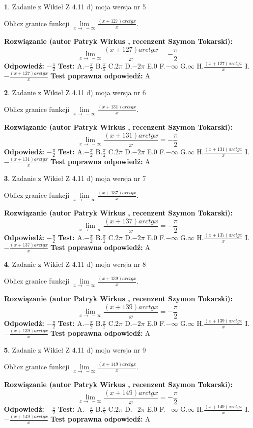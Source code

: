 \documentclass[12pt, a4paper]{article}
\theoremstyle{definition} %
\newtheorem{zad}{}
\newcommand{\zadStart}[1]{\begin{zad}#1\newline}
\newcommand{\zadStop}{\end{zad}}
\newcommand{\rozwStart}[2]{\noindent \textbf{Rozwiązanie (autor #1 , recenzent #2): }\newline}
\newcommand{\rozwStop}{\newline}
\newcommand{\odpStart}{\noindent \textbf{Odpowiedź:}\newline}
\newcommand{\odpStop}{\newline}
\newcommand{\testStart}{\noindent \textbf{Test:}\newline}
\newcommand{\testStop}{\newline}
\newcommand{\kluczStart}{\noindent \textbf{Test poprawna odpowiedź:}\newline}
\newcommand{\kluczStop}{\newline}
\begin{document}
\zadStart{Zadanie z Wikieł Z 4.11 d) moja wersja nr 5}

Oblicz granice funkcji $\lim\limits_{x\to\ -\infty}\frac{(x+127)arctgx}{x}$.
\zadStop
\rozwStart{Patryk Wirkus}{Szymon Tokarski}
$$\lim\limits_{x\to\ -\infty}\frac{(x+127)arctgx}{x} = -\frac{\pi}{2}$$
\rozwStop
\odpStart
$-\frac{\pi}{2}$
\odpStop
\testStart
A.$-\frac{\pi}{2}$ B.$\frac{\pi}{2}$ C.$2\pi$ D.$-2\pi$ E.$0$ F.$-\infty$ G.$\infty$ H.$\frac{(x+127)arctgx}{x}$ I.$-\frac{(x+127)arctgx}{x}$
\testStop
\kluczStart
A
\kluczStop



\zadStart{Zadanie z Wikieł Z 4.11 d) moja wersja nr 6}

Oblicz granice funkcji $\lim\limits_{x\to\ -\infty}\frac{(x+131)arctgx}{x}$.
\zadStop
\rozwStart{Patryk Wirkus}{Szymon Tokarski}
$$\lim\limits_{x\to\ -\infty}\frac{(x+131)arctgx}{x} = -\frac{\pi}{2}$$
\rozwStop
\odpStart
$-\frac{\pi}{2}$
\odpStop
\testStart
A.$-\frac{\pi}{2}$ B.$\frac{\pi}{2}$ C.$2\pi$ D.$-2\pi$ E.$0$ F.$-\infty$ G.$\infty$ H.$\frac{(x+131)arctgx}{x}$ I.$-\frac{(x+131)arctgx}{x}$
\testStop
\kluczStart
A
\kluczStop



\zadStart{Zadanie z Wikieł Z 4.11 d) moja wersja nr 7}

Oblicz granice funkcji $\lim\limits_{x\to\ -\infty}\frac{(x+137)arctgx}{x}$.
\zadStop
\rozwStart{Patryk Wirkus}{Szymon Tokarski}
$$\lim\limits_{x\to\ -\infty}\frac{(x+137)arctgx}{x} = -\frac{\pi}{2}$$
\rozwStop
\odpStart
$-\frac{\pi}{2}$
\odpStop
\testStart
A.$-\frac{\pi}{2}$ B.$\frac{\pi}{2}$ C.$2\pi$ D.$-2\pi$ E.$0$ F.$-\infty$ G.$\infty$ H.$\frac{(x+137)arctgx}{x}$ I.$-\frac{(x+137)arctgx}{x}$
\testStop
\kluczStart
A
\kluczStop



\zadStart{Zadanie z Wikieł Z 4.11 d) moja wersja nr 8}

Oblicz granice funkcji $\lim\limits_{x\to\ -\infty}\frac{(x+139)arctgx}{x}$.
\zadStop
\rozwStart{Patryk Wirkus}{Szymon Tokarski}
$$\lim\limits_{x\to\ -\infty}\frac{(x+139)arctgx}{x} = -\frac{\pi}{2}$$
\rozwStop
\odpStart
$-\frac{\pi}{2}$
\odpStop
\testStart
A.$-\frac{\pi}{2}$ B.$\frac{\pi}{2}$ C.$2\pi$ D.$-2\pi$ E.$0$ F.$-\infty$ G.$\infty$ H.$\frac{(x+139)arctgx}{x}$ I.$-\frac{(x+139)arctgx}{x}$
\testStop
\kluczStart
A
\kluczStop



\zadStart{Zadanie z Wikieł Z 4.11 d) moja wersja nr 9}

Oblicz granice funkcji $\lim\limits_{x\to\ -\infty}\frac{(x+149)arctgx}{x}$.
\zadStop
\rozwStart{Patryk Wirkus}{Szymon Tokarski}
$$\lim\limits_{x\to\ -\infty}\frac{(x+149)arctgx}{x} = -\frac{\pi}{2}$$
\rozwStop
\odpStart
$-\frac{\pi}{2}$
\odpStop
\testStart
A.$-\frac{\pi}{2}$ B.$\frac{\pi}{2}$ C.$2\pi$ D.$-2\pi$ E.$0$ F.$-\infty$ G.$\infty$ H.$\frac{(x+149)arctgx}{x}$ I.$-\frac{(x+149)arctgx}{x}$
\testStop
\kluczStart
A
\kluczStop
\end{document}

